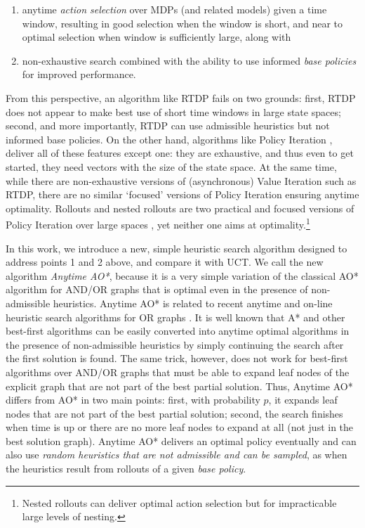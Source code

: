\documentclass[letterpaper]{article}
\begin{document}
\begin{enumerate}[1.]
\item {anytime} \emph{action selection} over MDPs (and related models) given a time window, resulting in 
good selection when the window is short, and  near to optimal selection when window is sufficiently large, along with 
\item non-exhaustive  search combined with the ability to  use  informed \emph{base policies} for improved performance.
\end{enumerate} From this perspective, an algorithm like RTDP fails on two grounds: first, RTDP does not
appear to make best use of short time windows in large state spaces;  second, and more importantly, 
RTDP  can use admissible heuristics but not informed base policies.  On the other hand, algorithms 
like Policy Iteration \cite{howard:pi}, deliver all of these features except one: they are exhaustive, and thus even to get started, 
they need vectors  with the size of the state space. At the same time, while there are non-exhaustive versions 
of (asynchronous) Value Iteration such as RTDP, there are no similar `focused' versions of Policy Iteration 
ensuring  anytime optimality. Rollouts and nested rollouts are two practical and focused versions of Policy  Iteration 
over large spaces \cite{bertsekas:rollouts,diaconis:nested}, yet neither one aims at optimality.\footnote{
Nested rollouts can deliver optimal action selection  but for impracticable large levels of nesting.}

In this work, we  introduce a new, simple heuristic search algorithm designed to  address points  1 and 2 above, 
and compare it with UCT. We call the new algorithm \emph{Anytime AO*}, because it is a
very simple variation of the classical AO* algorithm for  AND/OR graphs \cite{nilsson:book}
that is optimal even 
in the presence of non-admissible heuristics. Anytime AO* is related  to recent 
anytime and on-line heuristic search algorithms for OR graphs \cite{likhachev:ara,hansen:anytime,koenig:2009,thayer-ruml:anytime}.
It is well known that A* and other best-first algorithms can be  easily converted into anytime optimal algorithms
in the presence of non-admissible heuristics by simply continuing  the search after the first solution is found. The same trick, however,
does not work for  best-first algorithms over AND/OR graphs that must be able to expand leaf nodes of 
the explicit graph that are not part of the best partial solution.
Thus, Anytime AO* differs from AO* in two main points: first, with probability $p$,
it expands leaf nodes that are not part of the best partial solution; second, 
the search finishes when time is up or there are no more leaf nodes to expand at all
(not just in the best solution graph). Anytime AO*  delivers an optimal policy eventually 
and can also use \emph{random heuristics that are not admissible and can be sampled}, 
as when the heuristics result from rollouts of a given \emph{base policy}.  
\end{document}
